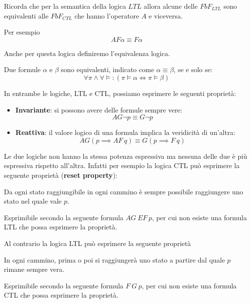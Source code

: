 \begin{nota}
    Ricorda che per la semantica della logica $LTL$ allora alcune delle $FbF_{LTL}$
    sono equivalenti alle $FbF_{CTL}$ che hanno l'operatore $A$ e viceversa.
    
    Per esempio
    \begin{equation}
        AF\alpha \equiv F\alpha 
    \end{equation}
\end{nota}
Anche per questa logica definiremo l'equivalenza logica.
\begin{definizione}
    Due formule $\alpha$ e $\beta$ sono equivalenti, indicato come $\alpha \equiv
        \beta$, se e solo se:
    \begin{equation}
        \forall \pi \land \forall \models : (\pi \models \alpha \iff \pi \models
        \beta)
    \end{equation}
\end{definizione}
In entrambe le logiche, LTL e CTL, possiamo esprimere le seguenti proprietà:
\begin{itemize}
    \item \textbf{Invariante}: si possono avere delle formule sempre vere:
          \begin{equation}
              AG\lnot p \equiv G\lnot p
          \end{equation}
    \item \textbf{Reattiva}: il valore logico di una formula implica la veridicità
          di un'altra:
          \begin{equation}
              AG (p\implies AF \ q) \equiv G(p\implies F \ q)
          \end{equation}
\end{itemize}
Le due logiche non hanno la stessa potenza espressiva ma nessuna delle due è più
espressiva rispetto all'altra. Infatti per esempio la logica CTL può esprimere
la seguente proprietà (\textbf{reset property}):
\begin{center}
    Da ogni stato raggiungibile in ogni cammino è sempre possibile raggiungere
    uno stato nel quale vale $p$.
\end{center}
Esprimibile secondo la seguente formula $AG \ EF \ p$, per cui non esiste una formula
LTL che possa esprimere la proprietà.

Al contrario la logica LTL può esprimere la seguente proprietà
\begin{center}
    In ogni cammino, prima o poi si raggiungerà uno stato a partire dal quale $p$
    rimane sempre vera.
\end{center}
Esprimibile secondo la seguente formula $F \ G \ p$, per cui non esiste una formula
CTL che possa esprimere la proprietà.

